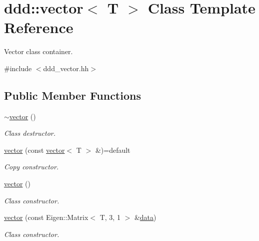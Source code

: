 \hypertarget{classddd_1_1vector}{}\section{ddd\+:\+:vector$<$ T $>$ Class Template Reference}
\label{classddd_1_1vector}


Vector class container.  




{\ttfamily \#include $<$ddd\+\_\+vector.\+hh$>$}

\subsection*{Public Member Functions}
\begin{DoxyCompactItemize}
\item 
\mbox{\label{classddd_1_1vector_aa318607b6bdd556e5aa371488b3b2da8}} 
\hyperlink{classddd_1_1vector_aa318607b6bdd556e5aa371488b3b2da8}{$\sim$vector} ()
\begin{DoxyCompactList}\small\item\em Class destructor. \end{DoxyCompactList}\item 
\mbox{\label{classddd_1_1vector_a9e10641f3e361c24f5a9756bbd1b2d44}} 
\hyperlink{classddd_1_1vector_a9e10641f3e361c24f5a9756bbd1b2d44}{vector} (const \hyperlink{classddd_1_1vector}{vector}$<$ T $>$ \&)=default
\begin{DoxyCompactList}\small\item\em Copy constructor. \end{DoxyCompactList}\item 
\mbox{\label{classddd_1_1vector_a5231808b18bae0590e5083ff27b29056}} 
\hyperlink{classddd_1_1vector_a5231808b18bae0590e5083ff27b29056}{vector} ()
\begin{DoxyCompactList}\small\item\em Class constructor. \end{DoxyCompactList}\item 
\hyperlink{classddd_1_1vector_a5dec8f05a011372b6b2795827607e6b2}{vector} (const Eigen\+::\+Matrix$<$ T, 3, 1 $>$ \&\hyperlink{classddd_1_1vector_a6d11c684bb82ca9f62973305048b601b}{data})
\begin{DoxyCompactList}\small\item\em Class constructor. \end{DoxyCompactList}\item 

\end{DoxyCompactItemize}

